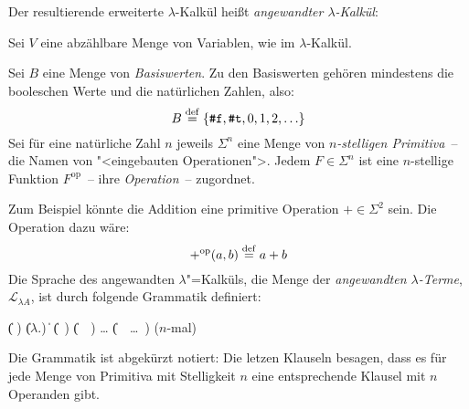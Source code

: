 Der resultierende erweiterte $\lambda$-Kalkül heißt 
\textit{angewandter $\lambda$-Kalkül}:

\begin{definition}\label{def:lambda-angewandt}
  
  Sei $V$ eine abzählbare Menge von Variablen, wie im
  $\lambda$-Kalkül.

  Sei $B$ eine Menge von \textit{Basiswerten}.  Zu
  den Basiswerten gehören mindestens die booleschen Werte und die
  natürlichen Zahlen, also:
  \begin{displaymath}
    B \stackrel{\rm def}{=}{} \{ \texttt{\#f}, \texttt{\#t}, 0, 1, 2, \ldots \}
  \end{displaymath}
  Sei für eine natürliche Zahl $n$ jeweils $\Sigma^n$ eine Menge von
  \textit{$n$-stelligen Primitiva}~-- die Namen von
  "<eingebauten Operationen">.  Jedem $F\in\Sigma^n$ ist eine
  $n$-stellige Funktion $F^{\textrm{op}}$~-- ihre \textit{Operation}~--
  zugordnet.

  Zum Beispiel könnte die Addition eine primitive Operation
  $+\in \Sigma^2$ sein.  Die Operation dazu wäre:
  \begin{displaymath}
    +^{\textrm{op}}(a, b) \stackrel{\rm def}{=} a + b
  \end{displaymath}
  Die Sprache des angewandten
  $\lambda$"=Kalküls, die Menge der \textit{angewandten
    $\lambda$-Terme},
  $\mathcal{L}_{\lambda{}A}$, ist
  durch folgende Grammatik definiert:
  \begin{grammar}
     \: 
    \> \| ( )
    \> \| ($\lambda$.)
    \> \| 
    \> \| (~)
    \> \| (~~)
    \> \ldots
    \> \| (~~\ldots~) \quad \textrm{($n$-mal)}
  \end{grammar}
\end{definition}
\vspace{-3ex}
%
Die Grammatik ist abgekürzt notiert: Die letzen Klauseln besagen,
dass es für jede Menge von Primitiva  mit
Stelligkeit $n$ eine entsprechende Klausel mit $n$ Operanden gibt.
